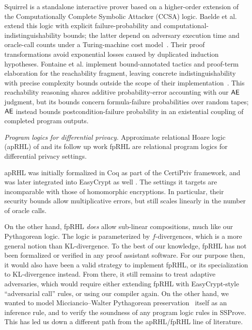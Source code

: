 Squirrel is a standalone interactive prover based on a higher-order extension of the Computationally Complete Symbolic Attacker (CCSA) logic.
Baelde et al. extend this logic with explicit failure-probability and computational-indistinguishability bounds; the latter depend on adversary execution time and oracle-call counts under a Turing-machine cost model~\cite{squirrel-concrete}.
Their proof transformations avoid exponential losses caused by duplicated induction hypotheses.
Fontaine et al. implement bound-annotated tactics and proof-term elaboration for the reachability fragment, leaving concrete indistinguishability with precise complexity bounds outside the scope of their implementation~\cite{squirrel-errors}.
This reachability reasoning shares additive probability-error accounting with our \(\mathsf{AE}\) judgment, but its bounds concern formula-failure probabilities over random tapes; \(\mathsf{AE}\) instead bounds postcondition-failure probability in an existential coupling of completed program outputs.

\emph{Program logics for differential privacy.}
Approximate relational Hoare logic (apRHL) of \cite{certipriv} and its follow up work fpRHL \cite{aprhl} are relational program logics for differential privacy settings.

apRHL was initially formalized in Coq as part of the CertiPriv framework,
and was later integrated into EasyCrypt as well \cite{aprhl-couplings, aprhl-advanced}.
The settings it targets are incomparable with those of homomorphic encryptions.
In particular, their security bounds allow multiplicative errors,
but still scales linearly in the number of oracle calls.

On the other hand, fpRHL \emph{does} allow sub-linear compositions, much like our Pythagorean logic.
The logic is parameterized by $f$-divergences, which is a more general notion than KL-divergence.
To the best of our knowledge, fpRHL has not been formalized or verified in any proof assistant software.
For our purpose then, it would also have been a valid strategy to implement fpRHL,
or its specialization to KL-divergence instead.
From there, it still remains to treat adaptive adversaries,
which would require either extending fpRHL with EasyCrypt-style ``adversarial call'' rules,
or using our compiler again.
On the other hand, we wanted to model Micciancio--Walter Pythagorean preservation~\cite{mw17} itself as an inference rule,
and to verify the soundness of any program logic rules in SSProve.
This has led us down a different path from the apRHL/fpRHL line of literature.
